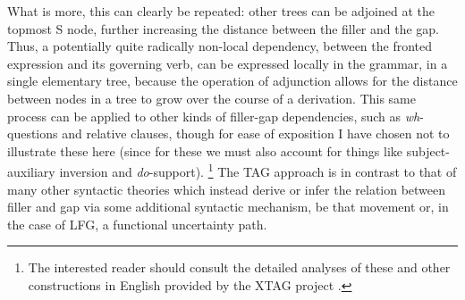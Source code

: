 \documentclass[output=paper,hidelinks]{langscibook}
\begin{document}
%
What is more, this can clearly be repeated: other trees can be adjoined at the
topmost S node, further increasing the distance between the filler and the gap.
Thus, a potentially quite radically non-local dependency, between the fronted
expression and its governing verb, can be expressed locally in the grammar, in a
single elementary tree, because the operation of adjunction allows for the
distance between nodes in a tree to grow over the course of a derivation. This
same process can be applied to other kinds of filler-gap dependencies, such as
\textit{wh}-questions and relative clauses, though for ease of exposition I have
chosen not to illustrate these here (since for these we must also account for
things like subject-auxiliary inversion and \textit{do}-support).%
%
\footnote{The interested reader should consult the detailed analyses of these
  and other constructions in English provided by the XTAG project \citep{xtag}.}
%
The TAG approach is
in contrast to that of many other syntactic theories which instead derive or
infer the relation between filler and gap via some additional syntactic
mechanism, be that movement or, in the case of LFG, a functional uncertainty
path.
\end{document}
